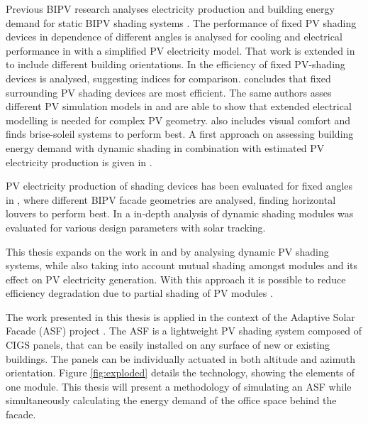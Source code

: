 	Previous BIPV research analyses electricity production and building energy demand for static BIPV shading systems \cite{sun2010, sun2012, David2011, mandalaki2012assessment, Mandalaki2014complexPV, mandalaki2014assessment, yoo2011available, jayathissa2015abs}. The performance of fixed PV shading devices in dependence of different angles is analysed for cooling and electrical performance in \cite{sun2010} with a simplified PV electricity model. That work is extended in \cite{sun2012} to include different building orientations. In \cite{David2011} the efficiency of fixed PV-shading devices is analysed, suggesting indices for comparison. \cite{mandalaki2012assessment} concludes that fixed surrounding PV shading devices are most efficient. The same authors asses different PV simulation models in \cite{Mandalaki2014complexPV} and are able to show that extended electrical modelling is needed for complex PV geometry. \cite{mandalaki2014assessment} also includes visual comfort and finds brise-soleil systems to perform best. A first approach on assessing building energy demand with dynamic shading in combination with estimated PV electricity production is given in \cite{jayathissa2015abs}. 

	PV electricity production of shading devices has been evaluated for fixed angles in \cite{freitas2015maximizing}, where different BIPV facade geometries are analysed, finding horizontal louvers to perform best. In \cite{hofer2015PVSEC} a in-depth analysis of dynamic shading modules was evaluated for various design parameters with solar tracking. 

	This thesis expands on the work in \cite{jayathissa2015abs} and \cite{hofer2015PVSEC} by analysing dynamic PV shading systems, while also taking into account mutual shading amongst modules and its effect on PV electricity generation. With this approach it is possible to reduce efficiency degradation due to partial shading of PV modules \cite{hofer2015PVSEC}.

	The work presented in this thesis is applied in the context of the Adaptive Solar Facade (ASF) project \cite{nagy2015frontiers}. The ASF is a lightweight PV shading system composed of CIGS panels, that can be easily installed on any surface of new or existing buildings. The panels can be individually actuated in both altitude and azimuth orientation. Figure \ref{fig:exploded} details the technology, showing the elements of one module. This thesis will present a methodology of simulating an ASF while simultaneously calculating the energy demand of the office space behind the facade.

